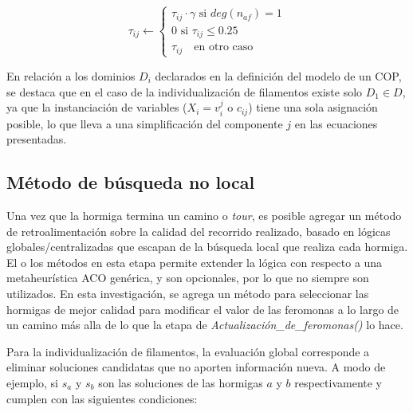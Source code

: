 \begin{equation}
    \tau_{ij} \leftarrow
        \begin{cases}
         \tau_{ij} \cdot \gamma \text{ si } deg(n_{af}) = 1  \\[3ex]
        
        \text{0 si } \tau_{ij} \leq 0.25 \\[3ex]
        \tau_{ij} \quad \text{en otro caso}
        \end{cases}
    \label{eq:antiPheroSAP_neuron}
\end{equation}


En relaci\'on a los dominios $D_i$ declarados en la definici\'on del modelo de un COP, se destaca que en el caso de la individualizaci\'on de filamentos existe solo $D_1 \in D$, ya que la instanciaci\'on de variables ($X_i = v_{i}^{j}$ o $c_{ij}$) tiene una sola asignaci\'on posible, lo que lleva a una simplificaci\'on del componente $j$ en las ecuaciones presentadas.

\subsection{M\'etodo de b\'usqueda no local}
Una vez que la hormiga termina un camino o {\it tour}, es posible agregar un m\'etodo de retroalimentaci\'on sobre la calidad del recorrido realizado, basado en l\'ogicas globales/centralizadas que escapan de la b\'usqueda local que realiza cada hormiga. El o los m\'etodos en esta etapa permite extender la l\'ogica con respecto a una metaheur\'istica ACO gen\'erica, y son opcionales, por lo que no siempre son utilizados. En esta investigaci\'on, se agrega un m\'etodo para seleccionar las hormigas de mejor calidad para modificar el valor de las feromonas a lo largo de un camino m\'as alla de lo que la etapa de {\it Actualizaci\'on\_de\_feromonas()} lo hace. 

Para la individualizaci\'on de filamentos, la evaluaci\'on global corresponde a eliminar soluciones candidatas que no aporten informaci\'on nueva. A modo de ejemplo, si $s_a$ y $s_b$ son las soluciones de las hormigas $a$ y $b$ respectivamente y cumplen con las siguientes condiciones:

